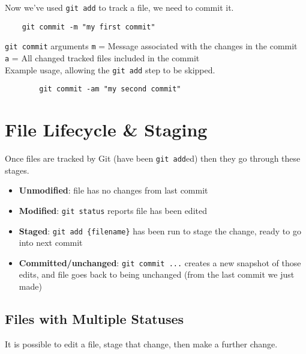 Now we've used \texttt{git add} to track a file, we need to commit it.

\begin{verbatim}
    git commit -m "my first commit"
\end{verbatim}

\begin{infobox}{\texttt{git commit} arguments}
    \texttt{m} = Message associated with the changes in the commit
    \\
    \texttt{a} = All changed tracked files included in the commit
    \\

    Example usage, allowing the \texttt{git add} step to be skipped.

    \begin{verbatim}
        git commit -am "my second commit"
    \end{verbatim}
\end{infobox}

\section{File Lifecycle \& Staging}

Once files are tracked by Git (have been \texttt{git add}ed) then they go through these stages.

\begin{itemize}
    \item \textbf{Unmodified}: file has no changes from last commit
    \item \textbf{Modified}: \texttt{git status} reports file has been edited
    \item \textbf{Staged}: \texttt{git add \{filename\}} has been run to stage the change, ready to go into next commit
    \item \textbf{Committed/unchanged}: \texttt{git commit ...} creates a new snapshot of those edits, and file goes back to being unchanged (from the last commit we just made)
\end{itemize}


\subsection{Files with Multiple Statuses}

It is possible to edit a file, stage that change, then make a further change.
\\

